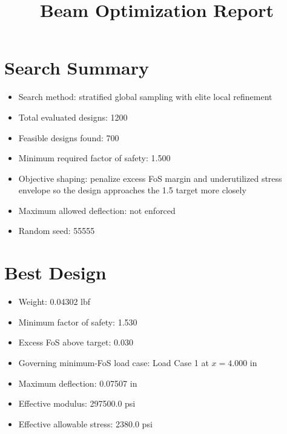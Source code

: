 \documentclass[11pt]{article}
\title{Beam Optimization Report}
\date{}
\begin{document}
\maketitle

\section*{Search Summary}
\begin{itemize}
\item Search method: stratified global sampling with elite local refinement
\item Total evaluated designs: 1200
\item Feasible designs found: 700
\item Minimum required factor of safety: 1.500
\item Objective shaping: penalize excess FoS margin and underutilized stress envelope so the design approaches the 1.5 target more closely
\item Maximum allowed deflection: not enforced
\item Random seed: 55555
\end{itemize}

\section*{Best Design}
\begin{itemize}
\item Weight: 0.04302 lbf
\item Minimum factor of safety: 1.530
\item Excess FoS above target: 0.030
\item Governing minimum-FoS load case: Load Case 1 at $x=4.000$ in
\item Maximum deflection: 0.07507 in
\item Effective modulus: 297500.0 psi
\item Effective allowable stress: 2380.0 psi
\end{itemize}
\end{document}
